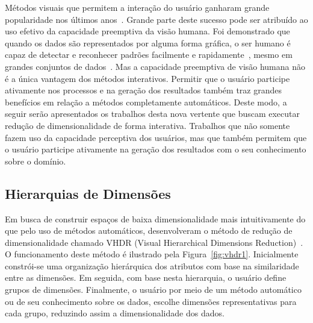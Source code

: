 Métodos visuais que permitem a interação do usuário ganharam grande popularidade nos últimos anos~\cite{State2012}. 
Grande parte deste sucesso pode ser atribuído ao uso efetivo da capacidade preemptiva da visão humana.
Foi demonstrado que quando os dados são representados por alguma forma gráfica, o ser humano é capaz de detectar e reconhecer padrões facilmente e rapidamente~\cite{Healey1995}, mesmo em grandes conjuntos de dados~\cite{Fodor2002}.
Mas a capacidade preemptiva de visão humana não é a única vantagem dos métodos interativos. Permitir que o usuário participe ativamente nos processos e na geração dos resultados também traz grandes benefícios em relação a métodos completamente automáticos.
Deste modo, a seguir serão apresentados os trabalhos desta nova vertente que buscam executar redução de dimensionalidade de forma interativa. Trabalhos que não somente fazem uso da capacidade perceptiva dos usuários, mas que também permitem que o usuário participe ativamente na geração dos resultados com o seu conhecimento sobre o domínio.

\subsection{Hierarquias de Dimensões}

Em busca de construir espaços de baixa dimensionalidade mais intuitivamente do que pelo uso de métodos automáticos, \citeauthor{Yang2003} desenvolveram o método de redução de dimensionalidade chamado VHDR (Visual Hierarchical Dimensions Reduction)~\cite{Yang2003}. O funcionamento deste método é ilustrado pela Figura~\ref{fig:vhdr1}. Inicialmente constrói-se uma organização hierárquica dos atributos com base na similaridade entre as dimensões. Em seguida, com base nesta hierarquia, o usuário define grupos de dimensões. Finalmente, o usuário por meio de um método automático ou de seu conhecimento sobre os dados, escolhe dimensões representativas para cada grupo, reduzindo assim a dimensionalidade dos dados. 

